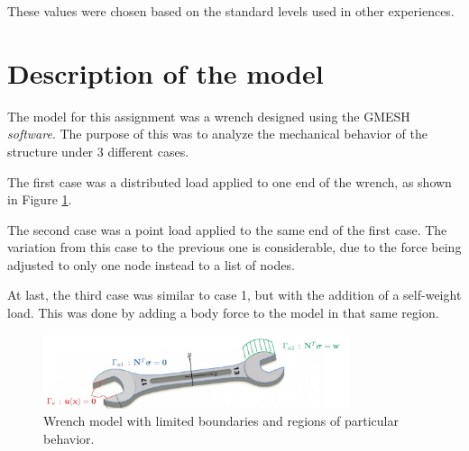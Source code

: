 \documentclass{article}  %
\begin{document}
These values were chosen based on the standard levels used in other experiences. \citet{farah2016}

\newpage

\section{Description of the model}

The model for this assignment was a wrench designed using the GMESH \textit{software}. The purpose of this was to analyze the mechanical behavior of the structure under 3 different cases. 

The first case was a distributed load applied to one end of the wrench, as shown in Figure \ref{caso1}.

The second case was a point load applied to the same end of the first case. The variation from this case to the previous one is considerable, due to the force being adjusted to only one node instead to a list of nodes.

At last, the third case was similar to case 1, but with the addition of a self-weight load. This was done by adding a body force to the model in that same region.

\begin{figure}[H]
  \centering
  \includegraphics[width=0.8\textwidth]{img/wrench.png}
  \caption{Wrench model with limited boundaries and regions of particular behavior.}
  \label{caso1}
\end{figure}





\end{document}
